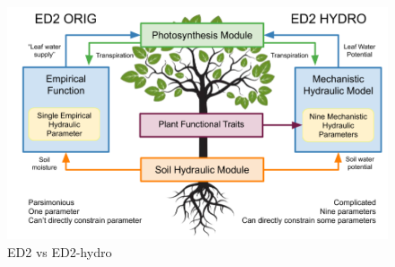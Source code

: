 \begin{figure}[h]
    \centering
    \includegraphics[width=.75\textwidth]{Hydro_Paper_LaTeX/Hydro_Paper_Figures/ED_versions.png}
    \caption[ED2 versions]{ED2 vs ED2-hydro}
    \label{fig:ED_versions}
\end{figure}